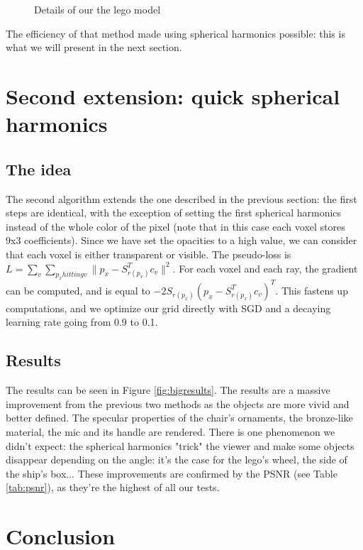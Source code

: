 \documentclass{article}
\begin{document}
\begin{figure}[!h]
\begin{subfigure}{.32\textwidth}
\end{subfigure}
   \caption{Details of our the lego model}
    \label{fig:ourccdetail}
\end{figure}

The efficiency of that method made using spherical harmonics possible: this is what we will present in the next section.

\section{Second extension: quick spherical harmonics}\label{sec:extent2}

\subsection{The idea}
The second algorithm extends the one described in the previous section: the first steps are identical, with the exception of setting the first spherical harmonics instead of the whole color of the pixel (note that in this case each voxel stores 9x3 coefficients). Since we have set the opacities to a high value, we can consider that each voxel is either transparent or visible. The pseudo-loss is $L = \sum_{v} \sum_{p_x hitting v} \|p_x - S_{r(p_x)}^T c_v\|^2$. For each voxel and each ray, the gradient can be computed, and is equal to $ -2 S_{r(p_x)} (p_x - S_{r(p_x)}^T c_v)^T$. This fastens up computations, and we optimize our grid directly with SGD and a decaying learning rate going from 0.9 to 0.1.

\subsection{Results}

The results can be seen in Figure \ref{fig:bigresults}. The results are a massive improvement from the previous two methods as the objects are more vivid and better defined. The specular properties of the chair's ornaments, the bronze-like material, the mic and its handle are rendered. There is one phenomenon we didn't expect: the spherical harmonics "trick" the viewer and make some objects disappear depending on the angle: it's the case for the lego's wheel, the side of the ship's box...  These improvements are confirmed by the PSNR (see Table \ref{tab:psnr}), as they're the highest of all our tests. 

\newpage

\section{Conclusion}
\end{document}
